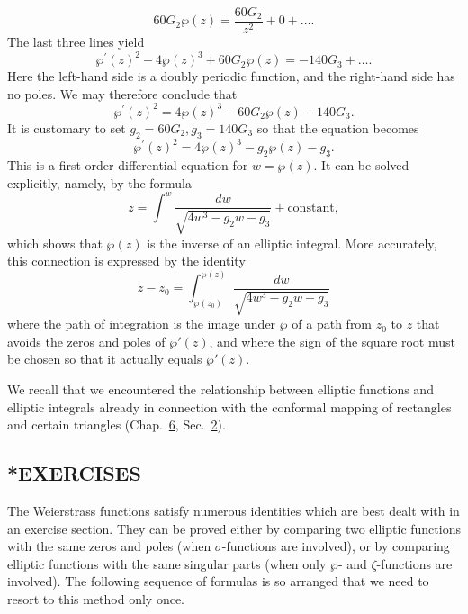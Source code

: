\begin{equation*}
60 G _ {2} \wp (z) = \frac {60 G _ {2}}{z ^ {2}} + 0 + \dots .
\end{equation*}
The last three lines yield
\begin{equation*}
\wp^ {\prime} (z) ^ {2} - 4 \wp (z) ^ {3} + 60 G _ {2} \wp (z) = - 140 G _ {3} + \dots .
\end{equation*}
Here the left-hand side is a doubly periodic function, and the right-hand side has no poles. We may therefore conclude that
\begin{equation*}
\wp^ {\prime} (z) ^ {2} = 4 \wp (z) ^ {3} - 60 G _ {2} \wp (z) - 140 G _ {3}.
\end{equation*}
It is customary to set $g_{2} = 60G_{2}, g_{3} = 140G_{3}$ so that the equation becomes
\begin{equation*}
\wp^ {\prime} (z) ^ {2} = 4 \wp (z) ^ {3} - g _ {2} \wp (z) - g _ {3}.\tag{15}\label{eq:7.15}
\end{equation*}
This is a first-order differential equation for $w = \wp(z)$. It can be solved explicitly, namely, by the formula
\begin{equation*}
z = \int^ {w} \frac {d w}{\sqrt {4 w ^ {3} - g _ {2} w - g _ {3}}} + \mathrm{constant},
\end{equation*}
which shows that $\wp(z)$ is the inverse of an elliptic integral. More accurately, this connection is expressed by the identity
\begin{equation*}
z - z _ {0} = \int_ {\wp (z _ {0})} ^ {\wp (z)} \frac {d w}{\sqrt {4 w ^ {3} - g _ {2} w - g _ {3}}}
\end{equation*}
where the path of integration is the image under $\wp$ of a path from $z_0$ to $z$ that avoids the zeros and poles of $\wp'(z)$, and where the sign of the square root must be chosen so that it actually equals $\wp'(z)$.

We recall that we encountered the relationship between elliptic functions and elliptic integrals already in connection with the conformal mapping of rectangles and certain triangles (Chap.~\hyperref[chap:6]{6}, Sec.~\hyperref[sec:6.2]{2}).

\subsection*{*EXERCISES}
The Weierstrass functions satisfy numerous identities which are best dealt with in an exercise section. They can be proved either by comparing two elliptic functions with the same zeros and poles (when $\sigma$-functions are involved), or by comparing elliptic functions with the same singular parts (when only $\wp$- and $\zeta$-functions are involved). The following sequence of formulas is so arranged that we need to resort to this method only once.

